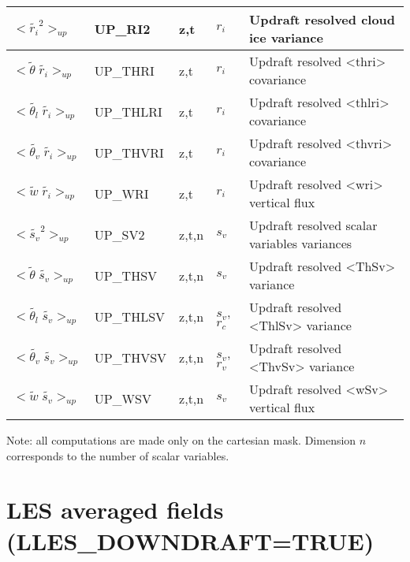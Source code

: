 \begin{longtable}[c]{|p{}|p{}|p{}|p{}|p{}|}
$<{\tilde{r_i}}^2>_{up}$                      & UP\_RI2   & z,t   & $r_i$ & Updraft resolved cloud ice variance \\\hline
$<{\tilde{\theta}\;\tilde{r_i}}>_{up}$        & UP\_THRI  & z,t   & $r_i$ & Updraft resolved <thri> covariance \\\hline
$<{\tilde{\theta_l}\;\tilde{r_i}}>_{up}$      & UP\_THLRI & z,t   & $r_i$ & Updraft resolved <thlri> covariance \\\hline
$<{\tilde{\theta_v}\;\tilde{r_i}}>_{up}$      & UP\_THVRI & z,t   & $r_i$ & Updraft resolved <thvri> covariance \\\hline
$<{\tilde{w}\;\tilde{r_i}}>_{up}$             & UP\_WRI   & z,t   & $r_i$ & Updraft resolved <wri> vertical flux \\\hline
$<{\tilde{s_v}}^2>_{up}$                      & UP\_SV2   & z,t,n & $s_v$ & Updraft resolved scalar variables variances \\\hline
$<{\tilde{\theta}\;\tilde{s_v}}>_{up}$        & UP\_THSV  & z,t,n & $s_v$ & Updraft resolved <ThSv> variance \\\hline
$<{\tilde{\theta_l}\;\tilde{s_v}}>_{up}$      & UP\_THLSV & z,t,n & $s_v$, $r_c$ & Updraft resolved <ThlSv> variance \\\hline
$<{\tilde{\theta_v}\;\tilde{s_v}}>_{up}$      & UP\_THVSV & z,t,n & $s_v$, $r_v$ & Updraft resolved <ThvSv> variance \\\hline
$<{\tilde{w}\;\tilde{s_v}}>_{up}$             & UP\_WSV   & z,t,n & $s_v$ & Updraft resolved <wSv> vertical flux \\\hline
\end{longtable}
\endgroup

Note: all computations are made only on the cartesian mask. Dimension $n$ corresponds to the number of scalar variables.


\section{LES averaged fields (LLES\_DOWNDRAFT=TRUE)}

